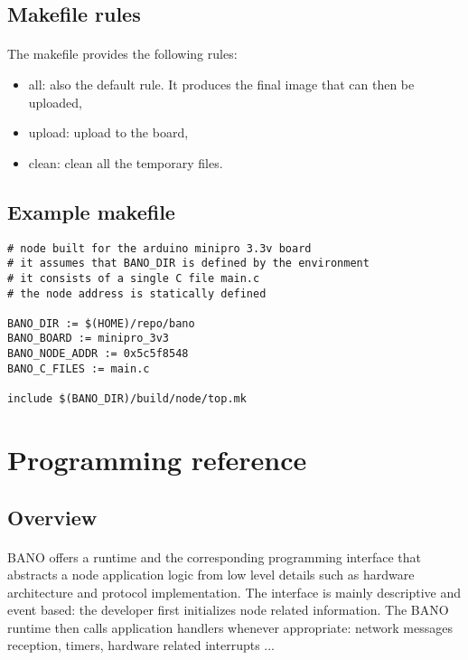 \documentclass[a4paper, 11pt]{article}
\begin{document}
\subsection{Makefile rules}
\paragraph{}
The makefile provides the following rules:
\begin{itemize}
\item all: also the default rule. It produces the final image
that can then be uploaded,
\item upload: upload to the board,
\item clean: clean all the temporary files.
\end{itemize}

\subsection{Example makefile}
\begin{scriptsize}
\begin{verbatim}
# node built for the arduino minipro 3.3v board
# it assumes that BANO_DIR is defined by the environment
# it consists of a single C file main.c
# the node address is statically defined

BANO_DIR := $(HOME)/repo/bano
BANO_BOARD := minipro_3v3
BANO_NODE_ADDR := 0x5c5f8548
BANO_C_FILES := main.c

include $(BANO_DIR)/build/node/top.mk
\end{verbatim}
\end{scriptsize}


\clearpage
\section{Programming reference}

\subsection{Overview}
\paragraph{}
BANO offers a runtime and the corresponding programming interface
that abstracts a node application logic from low level details
such as hardware architecture and protocol implementation. The
interface is mainly descriptive and event based: the developer
first initializes node related information. The BANO runtime then
calls application handlers whenever appropriate: network messages
reception, timers, hardware related interrupts ...
\end{document}
